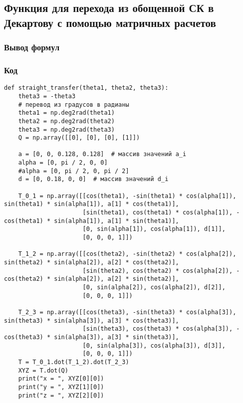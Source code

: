 \documentclass{article}
\begin{document}
\subsection{Функция для перехода из обощенной СК в Декартову с помощью матричных расчетов}
\subsubsection*{Вывод формул}

\subsubsection*{Код}
\begin{verbatim}
def straight_transfer(theta1, theta2, theta3):
    theta3 = -theta3
    # перевод из градусов в радианы
    theta1 = np.deg2rad(theta1)
    theta2 = np.deg2rad(theta2)
    theta3 = np.deg2rad(theta3)
    Q = np.array([[0], [0], [0], [1]])

    a = [0, 0, 0.128, 0.128]  # массив значений a_i
    alpha = [0, pi / 2, 0, 0]
    #alpha = [0, pi / 2, 0, pi / 2]
    d = [0, 0.18, 0, 0]  # массив значений d_i

    T_0_1 = np.array([[cos(theta1), -sin(theta1) * cos(alpha[1]), sin(theta1) * sin(alpha[1]), a[1] * cos(theta1)],
                      [sin(theta1), cos(theta1) * cos(alpha[1]), -cos(theta1) * sin(alpha[1]), a[1] * sin(theta1)],
                      [0, sin(alpha[1]), cos(alpha[1]), d[1]],
                      [0, 0, 0, 1]])

    T_1_2 = np.array([[cos(theta2), -sin(theta2) * cos(alpha[2]), sin(theta2) * sin(alpha[2]), a[2] * cos(theta2)],
                      [sin(theta2), cos(theta2) * cos(alpha[2]), -cos(theta2) * sin(alpha[2]), a[2] * sin(theta2)],
                      [0, sin(alpha[2]), cos(alpha[2]), d[2]],
                      [0, 0, 0, 1]])

    T_2_3 = np.array([[cos(theta3), -sin(theta3) * cos(alpha[3]), sin(theta3) * sin(alpha[3]), a[3] * cos(theta3)],
                      [sin(theta3), cos(theta3) * cos(alpha[3]), -cos(theta3) * sin(alpha[3]), a[3] * sin(theta3)],
                      [0, sin(alpha[3]), cos(alpha[3]), d[3]],
                      [0, 0, 0, 1]])
    T = T_0_1.dot(T_1_2).dot(T_2_3)
    XYZ = T.dot(Q)
    print("x = ", XYZ[0][0])
    print("y = ", XYZ[1][0])
    print("z = ", XYZ[2][0])
\end{verbatim}
\end{document}
